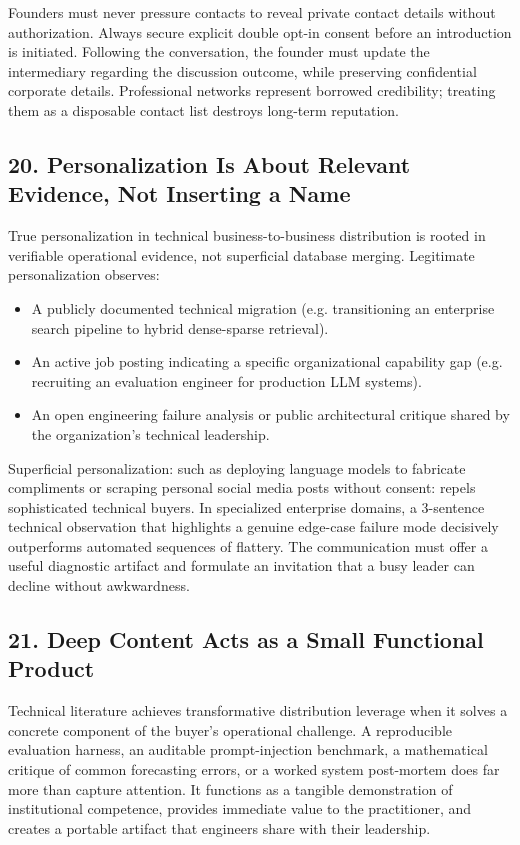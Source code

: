 Founders must never pressure contacts to reveal private contact details without authorization. Always secure explicit double opt-in consent before an introduction is initiated. Following the conversation, the founder must update the intermediary regarding the discussion outcome, while preserving confidential corporate details. Professional networks represent borrowed credibility; treating them as a disposable contact list destroys long-term reputation.

\subsection*{20. Personalization Is About Relevant Evidence, Not Inserting a Name}

True personalization in technical business-to-business distribution is rooted in verifiable operational evidence, not superficial database merging. Legitimate personalization observes:
\begin{itemize}[leftmargin=*,itemsep=1pt]
  \item A publicly documented technical migration (e.g. transitioning an enterprise search pipeline to hybrid dense-sparse retrieval).
  \item An active job posting indicating a specific organizational capability gap (e.g. recruiting an evaluation engineer for production LLM systems).
  \item An open engineering failure analysis or public architectural critique shared by the organization's technical leadership.
\end{itemize}

Superficial personalization: such as deploying language models to fabricate compliments or scraping personal social media posts without consent: repels sophisticated technical buyers. In specialized enterprise domains, a 3-sentence technical observation that highlights a genuine edge-case failure mode decisively outperforms automated sequences of flattery. The communication must offer a useful diagnostic artifact and formulate an invitation that a busy leader can decline without awkwardness.

\subsection*{21. Deep Content Acts as a Small Functional Product}

Technical literature achieves transformative distribution leverage when it solves a concrete component of the buyer's operational challenge. A reproducible evaluation harness, an auditable prompt-injection benchmark, a mathematical critique of common forecasting errors, or a worked system post-mortem does far more than capture attention. It functions as a tangible demonstration of institutional competence, provides immediate value to the practitioner, and creates a portable artifact that engineers share with their leadership.

